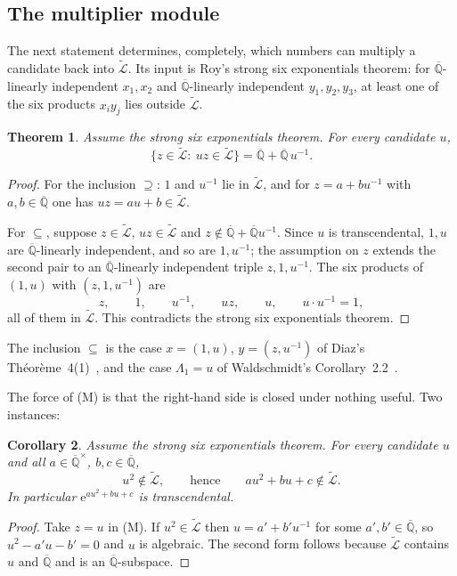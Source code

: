 \documentclass[11pt,a4paper]{article}
\theoremstyle{plain}
\newtheorem{theorem}{Theorem}[section]
\newtheorem{corollary}[theorem]{Corollary}
\theoremstyle{definition}
\newcommand{\e}{\mathrm{e}}
\newcommand{\Alg}{\overline{\mathbb{Q}}}
\newcommand{\aLogs}{\widetilde{\mathcal{L}}}
\begin{document}
\subsection*{The multiplier module}

The next statement determines, completely, which numbers can multiply a candidate back into
$\aLogs$. Its input is Roy's strong six exponentials theorem: for $\Alg$-linearly independent
$x_{1},x_{2}$ and $\Alg$-linearly independent $y_{1},y_{2},y_{3}$, at least one of the six
products $x_{i}y_{j}$ lies outside $\aLogs$.

\begin{theorem}\label{thm:multiplier}
Assume the strong six exponentials theorem. For every candidate $u$,
\[
  \{z\in\aLogs:\ uz\in\aLogs\}=\Alg+\Alg\,u^{-1}. \tag{M}
\]
\end{theorem}

\begin{proof}
For the inclusion $\supseteq$: $1$ and $u^{-1}$ lie in $\aLogs$, and for $z=a+bu^{-1}$ with
$a,b\in\Alg$ one has $uz=au+b\in\aLogs$.

For $\subseteq$, suppose $z\in\aLogs$, $uz\in\aLogs$ and $z\notin\Alg+\Alg u^{-1}$. Since $u$ is
transcendental, $1,u$ are $\Alg$-linearly independent, and so are $1,u^{-1}$; the assumption on
$z$ extends the second pair to an $\Alg$-linearly independent triple $z,1,u^{-1}$. The six
products of $(1,u)$ with $(z,1,u^{-1})$ are
\[
  z,\qquad 1,\qquad u^{-1},\qquad uz,\qquad u,\qquad u\cdot u^{-1}=1,
\]
all of them in $\aLogs$. This contradicts the strong six exponentials theorem.
\end{proof}

The inclusion $\subseteq$ is the case $x=(1,u)$, $y=(z,u^{-1})$ of Diaz's
Th\'eor\`eme~4(1)~\cite{diaz-2007}, and the case $\Lambda_{1}=u$ of Waldschmidt's
Corollary~2.2~\cite{waldschmidt-2005a}.

The force of (M) is that the right-hand side is closed under nothing useful. Two instances:

\begin{corollary}\label{cor:square}
Assume the strong six exponentials theorem. For every candidate $u$ and all $a\in\Alg^{\times}$,
$b,c\in\Alg$,
\[
  u^{2}\notin\aLogs, \qquad\text{hence}\qquad au^{2}+bu+c\notin\aLogs .
\]
In particular $\e^{au^{2}+bu+c}$ is transcendental.
\end{corollary}

\begin{proof}
Take $z=u$ in (M). If $u^{2}\in\aLogs$ then $u=a'+b'u^{-1}$ for some $a',b'\in\Alg$, so
$u^{2}-a'u-b'=0$ and $u$ is algebraic. The second form follows because $\aLogs$ contains $u$ and
$\Alg$ and is an $\Alg$-subspace.
\end{proof}
\end{document}
